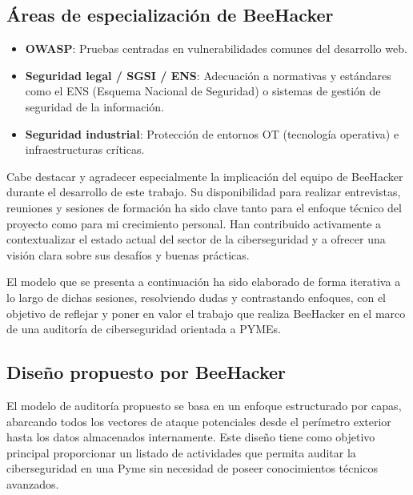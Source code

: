 \documentclass[a4paper, 11pt]{article}
\begin{document}
\subsection*{Áreas de especialización de BeeHacker}

\begin{itemize}
    \item \textbf{OWASP}: Pruebas centradas en vulnerabilidades comunes del desarrollo web.
    \item \textbf{Seguridad legal / SGSI / ENS}: Adecuación a normativas y estándares como el ENS (Esquema Nacional de Seguridad) o sistemas de gestión de seguridad de la información.
    \item \textbf{Seguridad industrial}: Protección de entornos OT (tecnología operativa) e infraestructuras críticas.
\end{itemize}

Cabe destacar y agradecer especialmente la implicación del equipo de BeeHacker durante el desarrollo de este trabajo. Su disponibilidad para realizar entrevistas, reuniones y sesiones de formación ha sido clave tanto para el enfoque técnico del proyecto como para mi crecimiento personal. Han contribuido activamente a contextualizar el estado actual del sector de la ciberseguridad y a ofrecer una visión clara sobre sus desafíos y buenas prácticas.
\par\vspace{0.5cm}

El modelo que se presenta a continuación ha sido elaborado de forma iterativa a lo largo de dichas sesiones, resolviendo dudas y contrastando enfoques, con el objetivo de reflejar y poner en valor el trabajo que realiza BeeHacker en el marco de una auditoría de ciberseguridad orientada a PYMEs.


\par\vspace{0.5cm}

\subsection{Diseño propuesto por BeeHacker}
\par\vspace{0.5cm}

El modelo de auditoría propuesto se basa en un enfoque estructurado por capas, abarcando todos los vectores de ataque 
potenciales desde el perímetro exterior hasta los datos almacenados internamente. 
Este diseño tiene como objetivo principal proporcionar un listado de actividades que permita
auditar la ciberseguridad en una Pyme sin necesidad de poseer conocimientos técnicos avanzados. 
\end{document}
